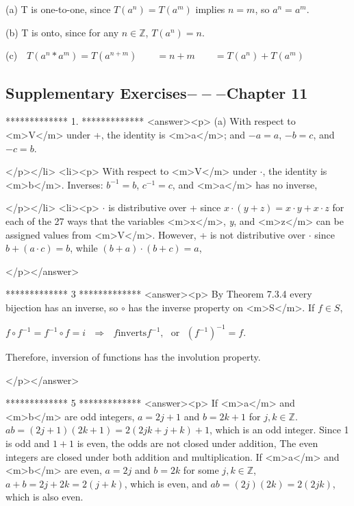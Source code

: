 (a)  T is one-to-one, since \(T\left(a^n\right) = T\left(a^m\right)\) implies \(n = m\), so \(a^n= a^m\).



(b)  T is onto, since for any \(n\in \mathbb{Z}\), \(T\left(a^n\right) = n\).



(c)   \(\text{          }T\left(a^n*a^m \right) = T\left(a^{n+m}\right)\quad \quad =n + m\quad \quad =T\left(a^n\right)+T\left(a^m\right)\)


\subsection{Supplementary Exercises$---$Chapter 11}

*************
1.
*************
<answer><p> (a) With respect to <m>V</m> under +, the identity is <m>a</m>; and \(-a=a\),  \(-b=c\), and \(-c=b\).

</p></li>
<li><p> With respect to <m>V</m> under \(\cdot\), the identity is <m>b</m>. Inverses:  \(b^{-1}=b\), \(c^{-1}=c\), and <m>a</m> has no inverse,

</p></li>
<li><p> \(\cdot\) is distributive over + since \(x \cdot  (y + z) = x \cdot y + x\cdot  z\) for each of the 27 ways that the variables <m>x</m>, \textit{
y}, and <m>z</m> can be assigned values from <m>V</m>.  However, + is not distributive over \(\cdot\) since \(b + (a \cdot c) = b\), while
\((b + a) \cdot  (b + c) = a\),

</p></answer>


*************
3
*************
<answer><p>  By Theorem 7.3.4 every bijection has an inverse, so \(\circ\) has the inverse property on <m>S</m>. If \(f \in  S\),



 \(f\circ f^{-1}= f^{-1}\circ f=i\text{    }\Rightarrow \text{  }f \text{inverts} f^{-1},\text{   }\text{or}\text{     }\left(f^{-1}\right)^{-1}=
f.\)



Therefore, inversion of functions has the involution property.

</p></answer>


*************
5
*************
<answer><p> If <m>a</m> and <m>b</m> are odd integers, \(a = 2j + 1\) and \(b = 2k + 1\) for \(j, k \in  \mathbb{Z}\). \(a b = (2j + 1)(2k + 1) = 2(2j
k + j + k) + 1\), which is an odd integer. Since 1 is odd and \(1 + 1\) is even, the odds are not closed under addition, The even integers are closed
under both addition and multiplication. If <m>a</m> and <m>b</m> are even, \(a = 2j\) and \(b = 2k\) for some \(j, k \in  \mathbb{Z}\), \(a
+ b = 2j + 2k = 2(j + k)\), which is even, and \(a b = (2j)(2k) = 2(2j k)\), which is also even.

